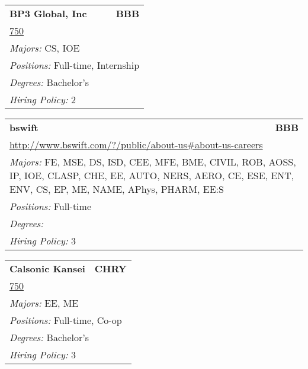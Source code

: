 \documentclass[twoside]{article}
\begin{document}
\begin{center}
\begin{multicols}{3}
\begin{FlushLeft}
\begin{minipage}{.9\columnwidth}
\end{minipage}
 
\begin{minipage}{.9\columnwidth}\begin{tabularx}{.95\columnwidth}{Xr}
                 {\Large\bf BP3 Global, Inc} & {\Large\bf BBB}\\
    \multicolumn{2}{p{.95\columnwidth}}{\url{750}}\\
    \multicolumn{2}{p{.95\columnwidth}}{\emph{Majors:} CS, IOE}\\
    \multicolumn{2}{p{.95\columnwidth}}{\emph{Positions:} Full-time, Internship}\\
    \multicolumn{2}{p{.95\columnwidth}}{\emph{Degrees:} Bachelor's}\\
    \multicolumn{2}{p{.95\columnwidth}}{\emph{Hiring Policy:} 2}\\
    \end{tabularx}
    
\end{minipage}
 
\begin{minipage}{.9\columnwidth}\begin{tabularx}{.95\columnwidth}{Xr}
                 {\Large\bf bswift} & {\Large\bf BBB}\\
    \multicolumn{2}{p{.95\columnwidth}}{\url{http://www.bswift.com/?/public/about-us\#about-us-careers}}\\
    \multicolumn{2}{p{.95\columnwidth}}{\emph{Majors:} FE, MSE, DS, ISD, CEE, MFE, BME, CIVIL, ROB, AOSS, IP, IOE, CLASP, CHE, EE, AUTO, NERS, AERO, CE, ESE, ENT, ENV, CS, EP, ME, NAME, APhys, PHARM, EE:S}\\
    \multicolumn{2}{p{.95\columnwidth}}{\emph{Positions:} Full-time}\\
    \multicolumn{2}{p{.95\columnwidth}}{\emph{Degrees:} }\\
    \multicolumn{2}{p{.95\columnwidth}}{\emph{Hiring Policy:} 3}\\
    \end{tabularx}
    
\end{minipage}
 
\begin{minipage}{.9\columnwidth}\begin{tabularx}{.95\columnwidth}{Xr}
                 {\Large\bf Calsonic Kansei} & {\Large\bf CHRY}\\
    \multicolumn{2}{p{.95\columnwidth}}{\url{750}}\\
    \multicolumn{2}{p{.95\columnwidth}}{\emph{Majors:} EE, ME}\\
    \multicolumn{2}{p{.95\columnwidth}}{\emph{Positions:} Full-time, Co-op}\\
    \multicolumn{2}{p{.95\columnwidth}}{\emph{Degrees:} Bachelor's}\\
    \multicolumn{2}{p{.95\columnwidth}}{\emph{Hiring Policy:} 3}\\
    \end{tabularx}
    

\end{minipage}
\end{FlushLeft}
\end{multicols}
\end{center}
\end{document}

